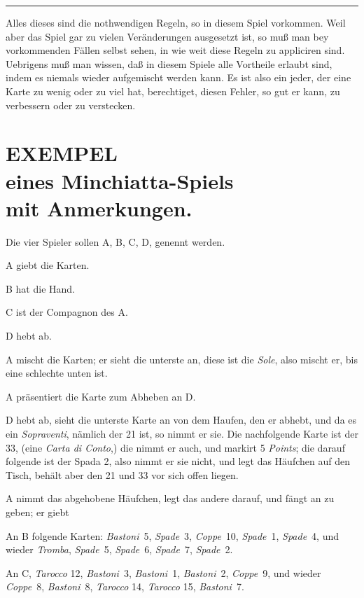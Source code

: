 \documentclass[11pt,a6paper,twoside]{article}
\newcommand{\separatingdash}{\kern 2pt {\hfill\rule[3pt]{9em}{1.3pt}\hfill} \kern 12pt}
\begin{document}
\separatingdash

Alles dieses sind die nothwendigen Regeln, so in diesem Spiel vorkommen. Weil aber das Spiel gar zu vielen Veränderungen ausgesetzt ist, so muß man bey vorkommenden Fällen selbst sehen, in wie weit diese Regeln zu appliciren sind. Uebrigens muß man wissen, daß in diesem Spiele alle Vortheile erlaubt sind, indem es niemals wieder aufgemischt werden kann. Es ist also ein jeder, der eine Karte zu wenig oder zu viel hat, berechtiget, diesen Fehler, so gut er kann, zu verbessern oder zu verstecken.


\section*{{\scshape\upshape EXEMPEL}\\eines Minchiatta-Spiels\\ mit Anmerkungen.}

Die vier Spieler sollen A, B, C, D, genennt werden.

A giebt die Karten.

B hat die Hand.

C ist der Compagnon des A.

D hebt ab.

A mischt die Karten; er sieht die unterste an, diese ist die \textit{Sole}, also mischt er, bis eine schlechte unten ist.

A präsentiert die Karte zum Abheben an D.

D hebt ab, sieht die unterste Karte an von dem Haufen, den er abhebt, und da es ein \textit{Sopraventi}, nämlich der 21 ist, so nimmt er sie. Die nachfolgende Karte ist der 33, (eine \textit{Carta di Conto},) die nimmt er auch, und markirt 5 \textit{Points}; die darauf folgende ist der Spada 2, also nimmt er sie nicht, und legt das Häufchen auf den Tisch, behält aber den 21 und 33 vor sich offen liegen.

A nimmt das abgehobene Häufchen, legt das andere darauf, und fängt an zu geben; er giebt

An B folgende Karten: \textit{Bastoni}~5, \textit{Spade}~3, \textit{Coppe}~10, \textit{Spade}~1, \textit{Spade}~4, und wieder \textit{Tromba}, \textit{Spade}~5, \textit{Spade}~6, \textit{Spade}~7, \textit{Spade}~2.

An C, \textit{Tarocco} 12, \textit{Bastoni}~3, \textit{Bastoni}~1, \textit{Bastoni}~2, \textit{Coppe}~9, und wieder \textit{Coppe}~8, \textit{Bastoni}~8, \textit{Tarocco} 14, \textit{Tarocco} 15, \textit{Bastoni}~7.
\end{document}
